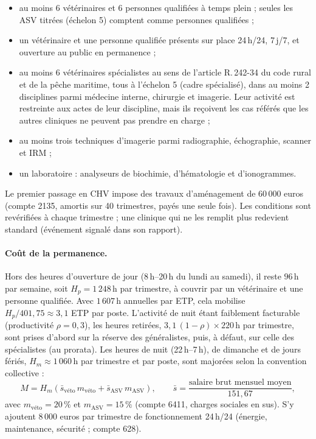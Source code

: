 \documentclass[11pt,a4paper]{article}
\begin{document}
\begin{itemize}
  \item au moins 6 vétérinaires et 6 personnes qualifiées à temps plein ;
    seules les ASV titrées (échelon 5) comptent comme personnes qualifiées ;
  \item un vétérinaire et une personne qualifiée présents sur place
    24\,h/24, 7\,j/7, et ouverture au public en permanence ;
  \item au moins 6 vétérinaires spécialistes au sens de l'article R.\,242-34
    du code rural et de la pêche maritime, tous à l'échelon 5 (cadre
    spécialisé), dans au moins 2 disciplines parmi médecine interne,
    chirurgie et imagerie. Leur activité est restreinte aux actes de leur
    discipline, mais ils reçoivent les cas référés que les autres cliniques
    ne peuvent pas prendre en charge ;
  \item au moins trois techniques d'imagerie parmi radiographie,
    échographie, scanner et IRM ;
  \item un laboratoire : analyseurs de biochimie, d'hématologie et
    d'ionogrammes.
\end{itemize}

Le premier passage en CHV impose des travaux d'aménagement de
60\,000 euros (compte 2135, amortis sur 40 trimestres, payés une seule
fois). Les conditions sont revérifiées à chaque trimestre ; une clinique
qui ne les remplit plus redevient standard (événement signalé dans son
rapport).

\paragraph{Coût de la permanence.} Hors des heures d'ouverture de jour
(8\,h--20\,h du lundi au samedi), il reste $96$\,h par semaine, soit
$H_p = 1\,248$\,h par trimestre, à couvrir par un vétérinaire et une
personne qualifiée. Avec $1\,607$\,h annuelles par ETP, cela mobilise
$H_p / 401{,}75 \approx 3{,}1$ ETP par poste. L'activité de nuit étant
faiblement facturable (productivité $\rho = 0{,}3$), les heures retirées,
$3{,}1\,(1-\rho) \times 220$\,h par trimestre, sont prises d'abord sur la
réserve des généralistes, puis, à défaut, sur celle des spécialistes
(au prorata).
Les heures de nuit (22\,h--7\,h), de dimanche et de jours fériés,
$H_m \approx 1\,060$\,h par trimestre et par poste, sont majorées selon la
convention collective :
\[
  M = H_m \left( \bar{s}_{\text{véto}}\, m_{\text{véto}} + \bar{s}_{\text{ASV}}\, m_{\text{ASV}} \right),
  \qquad \bar{s} = \frac{\text{salaire brut mensuel moyen}}{151{,}67},
\]
avec $m_{\text{véto}} = 20\,\%$ et $m_{\text{ASV}} = 15\,\%$ (compte 6411,
charges sociales en sus). S'y ajoutent 8\,000 euros par trimestre de
fonctionnement 24\,h/24 (énergie, maintenance, sécurité ; compte 628).
\end{document}
